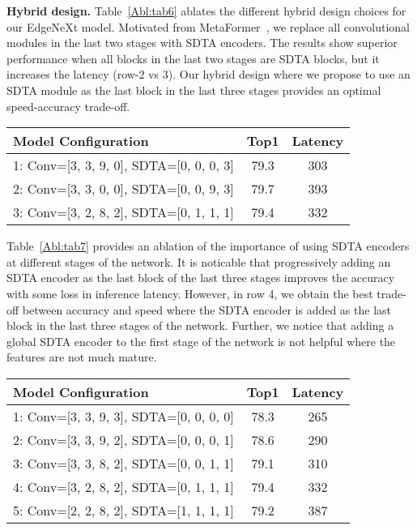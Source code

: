 \documentclass[runningheads]{llncs}
\begin{document}
\noindent\textbf{Hybrid design.}
Table~\ref{Abl:tab6} ablates the different hybrid design choices for our EdgeNeXt model. Motivated from MetaFormer~\cite{yu2021metaformer}, we replace all convolutional modules in the last two stages with SDTA encoders. The results show superior performance when all blocks in the last two stages are SDTA blocks, but it increases the latency (row-2 vs 3). Our hybrid design where we propose to use an SDTA module as the last block in the last three stages provides an optimal speed-accuracy trade-off.

\begin{SCtable}[\sidecaptionrelwidth][h!]
\begin{tabular}{l|c|c}
\toprule
\rowcolor{Gray} Model Configuration & Top1 & Latency  \\
\midrule
1: Conv=[3, 3, 9, 0], SDTA=[0, 0, 0, 3] & 79.3 & 303  \\
2: Conv=[3, 3, 0, 0], SDTA=[0, 0, 9, 3] & 79.7 & 393  \\
\rowcolor{orange!6} 3: Conv=[3, 2, 8, 2], SDTA=[0, 1, 1, 1] & 79.4 & 332  \\
\bottomrule 
\end{tabular}
\caption{Ablation on the hybrid architecture. Using one SDTA encoder as the last block in the last three stages provides an optimal accuracy-latency trade-off.}
\label{Abl:tab6}
\end{SCtable}



Table~\ref{Abl:tab7} provides an ablation of the importance of using SDTA encoders at different stages of the network. It is noticable that progressively adding an SDTA encoder as the last block of the last three stages improves the accuracy with some loss in inference latency. However, in row 4, we obtain the best trade-off between accuracy and speed where the SDTA encoder is added as the last block in the last three stages of the network. Further, we notice that adding a global SDTA encoder to the first stage of the network is not helpful where the features are not much mature.

\begin{SCtable}[\sidecaptionrelwidth][h!]
\begin{tabular}{l|c|c}
\toprule
\rowcolor{Gray} Model Configuration & Top1 & Latency  \\
\midrule
1: Conv=[3, 3, 9, 3], SDTA=[0, 0, 0, 0] & 78.3 & 265  \\
2: Conv=[3, 3, 9, 2], SDTA=[0, 0, 0, 1] & 78.6 & 290  \\
3: Conv=[3, 3, 8, 2], SDTA=[0, 0, 1, 1] & 79.1 & 310  \\
\rowcolor{orange!6} 4: Conv=[3, 2, 8, 2], SDTA=[0, 1, 1, 1] & 79.4 & 332  \\
5: Conv=[2, 2, 8, 2], SDTA=[1, 1, 1, 1] & 79.2 & 387  \\
\bottomrule 
\end{tabular}
\caption{Ablation on using SDTA encoder at different stages of the network. Including SDTA encoders in the last three stages improves performance, whereas a global SDTA encoder is not helpful in the first stage.}
\label{Abl:tab7}
\end{SCtable}
\end{document}
